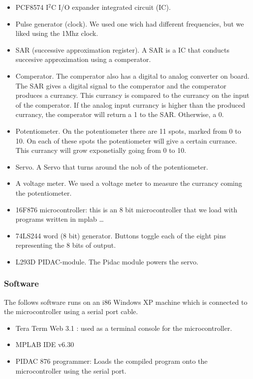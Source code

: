 \documentclass[a4paper, 12pt, titlepage]{article}
\begin{document}
\begin{itemize}
\item PCF8574 I$^2$C I/O expander integrated circuit (IC).
\item Pulse generator (clock). We used one wich had different frequencies, but we liked using the 1Mhz clock.
\item SAR (successi­ve approxima­ti­on register). A SAR is a IC that conducts succesive approximation using a comperator.
\item Comperator. The comperator also has a digital to analog converter on board. The SAR gives a digital signal to the comperator and the comperator produces a currancy. This currancy is compared to the currancy on the input of the comperator. If the analog input currancy is higher than the produced currancy, the comperator will return a 1 to the SAR. Otherwise, a 0.
\item Potentiometer. On the potentiometer there are 11 spots, marked from 0 to 10. On each of these spots the potentiometer will give a certain currance. This currancy will grow exponetially going from 0 to 10. 
\item Servo. A Servo that turns around the nob of the potentiometer.
\item A voltage meter. We used a voltage meter to measure the currancy coming the potentiometer. 
\item 16F876 microcontroller: this is an 8 bit microcontroller that we load with
programs written in mplab \dots
\item 74LS244 word (8 bit) generator. Buttons toggle each of the eight pins
representing the 8 bits of output.
\item L293D PIDAC-module. The Pidac module powers the servo.
\end{itemize}

\subsubsection{Software}
The follows software runs on an i86 Windows XP machine which is connected to the
microcontroller using a serial port cable.
\begin{itemize}
\item Tera Term Web 3.1 : used as a terminal console for the microcontroller.
\item MPLAB IDE v6.30
\item PIDAC 876 programmer: Loads the compiled program onto the microcontroller
using the serial port.
\end{itemize}
\end{document}
